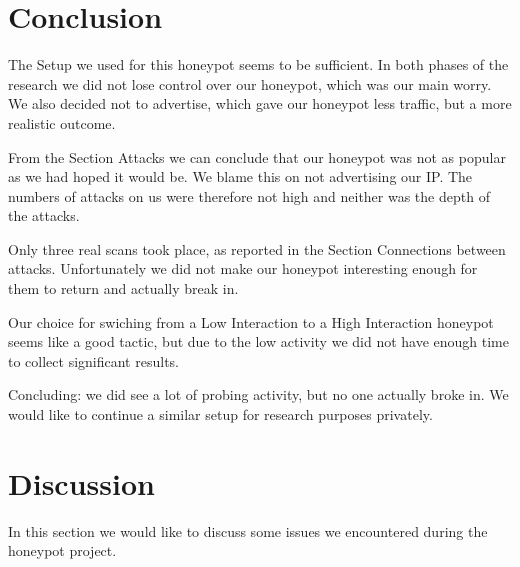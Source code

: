 \documentclass[11pt]{article}
\begin{document}
\section{Conclusion}
\label{Conclusion}
The Setup we used for this honeypot seems to be sufficient. In both phases of the research we did not lose control over our honeypot, which was our main worry. We also decided not to advertise, which gave our honeypot less traffic, but a more realistic outcome.

From the Section Attacks we can conclude that our honeypot was not as popular as we had hoped it would be. We blame this on not advertising our IP. The numbers of attacks on us were therefore not high and neither was the depth of the attacks.

Only three real scans took place, as reported in the Section Connections between attacks. Unfortunately we did not make our honeypot interesting enough for them to return and actually break in.

Our choice for swiching from a Low Interaction to a High Interaction honeypot seems like a good tactic, but due to the low activity we did not have enough time to collect significant results.

Concluding: we did see a lot of probing activity, but no one actually broke in.
We would like to continue a similar setup for research purposes privately.

\section{Discussion}
\label{Discussion}
In this section we would like to discuss some issues we encountered during the honeypot project. 
\end{document}
